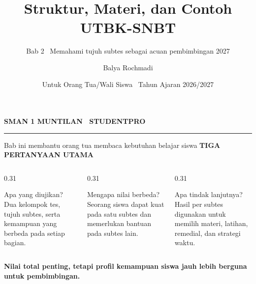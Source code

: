 \documentclass[aspectratio=169,11pt]{beamer}
\title{Struktur, Materi, dan Contoh\\UTBK-SNBT}
\subtitle{Bab 2 \textbar\ Memahami tujuh subtes sebagai acuan pembimbingan 2027}
\author{Balya Rochmadi}
\date{Untuk Orang Tua/Wali Siswa \textbar\ Tahun Ajaran 2026/2027}
\newcommand{\kicker}[1]{%
  {\color{StudentCyan}\bfseries\fontsize{10.5}{13}\selectfont\MakeUppercase{#1}}\par\vspace{0.11cm}
}
\begin{document}
\begingroup
{}
\begin{frame}[plain]
  \vspace{0.65cm}
  \kicker{SMAN 1 Muntilan \textbar\ StudentPro}
  \vspace{0.08cm}
  {\color{StudentWhite}\inserttitle\par}
  \vspace{0.36cm}
  {\color{StudentSoft}\insertsubtitle\par}
  \vfill
  {\color{StudentGold}\rule{2.3cm}{2.5pt}}\par
  \vspace{0.20cm}
  {\color{StudentWhite}\insertauthor}\par
  {\color{StudentSoft}\insertdate}
  \vspace{0.42cm}
\end{frame}
\endgroup

\begin{frame}{Bab ini membantu orang tua membaca kebutuhan belajar siswa}
  \kicker{Tiga Pertanyaan Utama}
  \begin{columns}[T,onlytextwidth]
    \begin{column}{0.31\textwidth}
      \begin{block}{Apa yang diujikan?}
        Dua kelompok tes, tujuh subtes, serta kemampuan yang berbeda pada setiap bagian.
      \end{block}
    \end{column}
    \begin{column}{0.31\textwidth}
      \begin{block}{Mengapa nilai berbeda?}
        Seorang siswa dapat kuat pada satu subtes dan memerlukan bantuan pada subtes lain.
      \end{block}
    \end{column}
    \begin{column}{0.31\textwidth}
      \begin{block}{Apa tindak lanjutnya?}
        Hasil per subtes digunakan untuk memilih materi, latihan, remedial, dan strategi waktu.
      \end{block}
    \end{column}
  \end{columns}
  \vspace{0.18cm}
  \centering
  {\color{StudentNavy}\bfseries\fontsize{13}{16}\selectfont Nilai total penting, tetapi profil kemampuan siswa jauh lebih berguna untuk pembimbingan.}
\end{frame}
\end{document}
